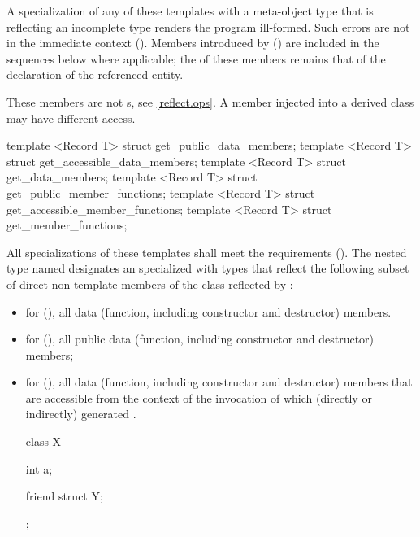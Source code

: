 \begin{std.txt}\color{addclr}
\pnum
A specialization of any of these templates with a meta-object type that is
reflecting an incomplete type renders the program ill-formed.  Such errors are
not in the immediate context ().
Members introduced by  () are included in the sequences below where applicable; the  of these members remains that of the declaration of the referenced entity. \begin{note} These members are not s, see \ref{reflect.ops}. A member injected into a derived class may have different access. \end{note}

\begin{itemdecl}
template <Record T> struct get_public_data_members;
template <Record T> struct get_accessible_data_members;
template <Record T> struct get_data_members;
template <Record T> struct get_public_member_functions;
template <Record T> struct get_accessible_member_functions;
template <Record T> struct get_member_functions;
\end{itemdecl}

\begin{itemdescr}
\pnum
All specializations of these templates shall meet the  requirements (). The nested type named  designates an  specialized with  types that reflect the following subset of direct non-template members of the class reflected by :
\begin{itemize}
  \item for  (), all data (function, including constructor and destructor) members.
  \item for  (), all public data (function, including constructor and destructor) members;
  \item for  (), all data (function, including constructor and destructor) members that are accessible from the context of the invocation of  which (directly or indirectly) generated .
\begin{example}\begin{codeblock}
class X {
   int a;

   friend struct Y;
};


\end{codeblock}
\end{example}
\end{itemize}
\end{itemdescr}
\end{std.txt}
